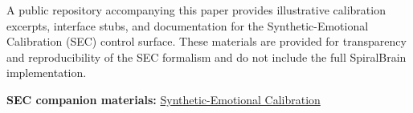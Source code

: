 \documentclass[12pt,a4paper]{article}
\begin{document}
A public repository accompanying this paper provides illustrative calibration excerpts, interface stubs, and documentation for the Synthetic-Emotional Calibration (SEC) control surface. These materials are provided for transparency and reproducibility of the SEC formalism and do not include the full SpiralBrain implementation.

\medskip
\noindent\textbf{SEC companion materials:}  
\href{https://github.com/jhcragin/SpiralBrain-v3.0-public/tree/91fdc4ae0dc23b9a40c89d97f385aacfb6461712/Synthetic-Emotional%20Calibration}{Synthetic-Emotional Calibration}



\end{document}
